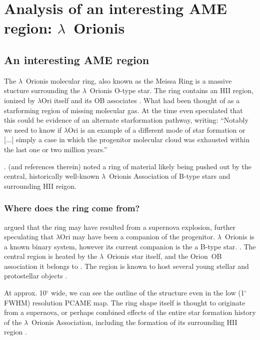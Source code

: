 \chapter{Analysis of an interesting AME region: $\lambda$~Orionis}
\label{ch:lori}

 \section{An interesting AME region}
		The $\lambda$~Orionis molecular ring, also known as the Meissa Ring is a massive stucture surrounding the $\lambda$~Orionis O-type star. The ring contains an HII region, ionized by $\lambda$Ori itself and its OB associates \citep{murdin77}. What had been thought of as a star\-forming region of missing molecular gas. At the time \cite{murdin77} even speculated that this could be evidence of an alternate star\-formation pathway, writing: ``Notably we need to know if $\lambda$Ori is an example of a different mode of star formation or [...] simply a case in which the progenitor molecular cloud was exhausted within the last one or two million years.''

    \cite{maddalena86,maddalena87}.  (and references therein) noted a ring of material likely being pushed out by the central, historically well-known $\lambda$~Orionis Association of B-type stars and surrounding HII reigon.

   \subsection{Where does the ring come from?}
    \cite{cunha96} argued that the ring may have resulted from a supernova explosion, further speculating that $\lambda$Ori may have been a companion of the progenitor. $\lambda$~Orionis is a known binary system, however its current companion is the a B-type star. \citep{murdin77}
  .
     The central region is heated by the $\lambda$~Orionis star itself, and the Orion~OB association it belongs to \citep{ochsendorf15}. The region is known to host several young stellar and protostellar objects \citep{koenig15}.

    At approx. 10$^{\circ}$ wide, we can see the outline of the structure even in the low (1$^{\circ}$ FWHM) resolution PCAME map. The ring shape itself is thought to originate from a supernova, or perhaps combined effects of the entire star formation history of the $\lambda$~Orionis Association, including the formation of its surrounding HII region \citep{aran09}.

